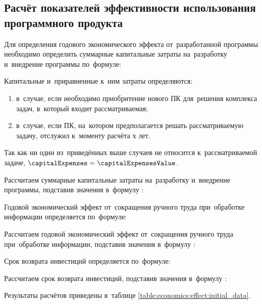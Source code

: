 \subsection{Расчёт показателей эффективности использования программного продукта}
\label{sec:economics:efficiency}

Для определения годового экономического эффекта от~разработанной программы необходимо определить суммарные капитальные затраты на~разработку и~внедрение программы по~формуле:
\totalCapitalExpensesEquation

Капитальные и~приравненные к~ним затраты определяются:
\begin{enumerate}
	\item в~случае, если необходимо приобритение нового ПК для~решения комплекса задач, в~который входит рассматриваемая;
	\item в~случае, если ПК, на~котором предполагается решать рассматриваемую задачу, отслужил к~моменту расчёта х лет.
\end{enumerate}

Так как ни один из~приведённых выше случаев не относится к~рассматриваемой задаче, \(\capitalExpenses = \capitalExpensesValue\).

Рассчитаем суммарные капитальные затраты на~разработку и~внедрение программы, подставив значения в~формулу :
\totalCapitalExpensesFormulaApplied

Годовой экономический эффект от~сокращения ручного труда при~обработке информации определяется по~формуле:
\annualEconomicEffectEquation

Рассчитаем годовой экономический эффект от~сокращения ручного труда при~обработке информации, подставив значения в~формулу :
\annualEconomicEffectFormulaApplied

Срок возврата инвестиций определяется по~формуле:
\investmentMoneyReturnTimeEquation

Рассчитаем срок возврата инвестиций, подставив значения в~формулу :
\investmentMoneyReturnTimeFormulaApplied

Результаты расчётов приведены в~таблице \ref{table:economics:effect:initial_data}.

